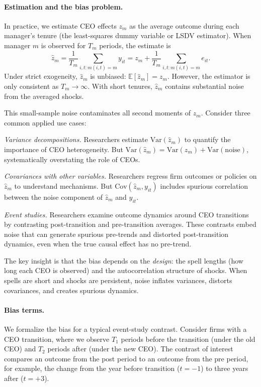 \documentclass[11pt,a4paper]{article}
\newcommand{\Var}{\text{Var}}
\newcommand{\Cov}{\text{Cov}}
\begin{document}
\paragraph{Estimation and the bias problem.} In practice, we estimate CEO effects $z_m$ as the average outcome during each manager's tenure (the least-squares dummy variable or LSDV estimator). When manager $m$ is observed for $T_m$ periods, the estimate is
$$
\hat z_m = \frac{1}{T_m}\sum_{i,t:m(i,t)=m} y_{it} = z_m + \frac{1}{T_m}\sum_{i,t:m(i,t)=m} e_{it}.
$$
Under strict exogeneity, $\hat z_m$ is unbiased: $\mathbb E[\hat z_m] = z_m$. However, the estimator is only consistent as $T_m\to\infty$. With short tenures, $\hat z_m$ contains substantial noise from the averaged shocks.

This small-sample noise contaminates all second moments of $\hat z_m$. Consider three common applied use cases:

\textit{Variance decompositions.} Researchers estimate $\Var(\hat z_m)$ to quantify the importance of CEO heterogeneity. But $\Var(\hat z_m) = \Var(z_m) + \Var(\text{noise})$, systematically overstating the role of CEOs.

\textit{Covariances with other variables.} Researchers regress firm outcomes or policies on $\hat z_m$ to understand mechanisms. But $\Cov(\hat z_m, y_{it})$ includes spurious correlation between the noise component of $\hat z_m$ and $y_{it}$.

\textit{Event studies.} Researchers examine outcome dynamics around CEO transitions by contrasting post-transition and pre-transition averages. These contrasts embed noise that can generate spurious pre-trends and distorted post-transition dynamics, even when the true causal effect has no pre-trend.

The key insight is that the bias depends on the \emph{design}: the spell lengths (how long each CEO is observed) and the autocorrelation structure of shocks. When spells are short and shocks are persistent, noise inflates variances, distorts covariances, and creates spurious dynamics.

\paragraph{Bias terms.} We formalize the bias for a typical event-study contrast. Consider firms with a CEO transition, where we observe $T_1$ periods before the transition (under the old CEO) and $T_2$ periods after (under the new CEO). The contrast of interest compares an outcome from the post period to an outcome from the pre period, for example, the change from the year before transition ($t=-1$) to three years after ($t=+3$). 
\end{document}
